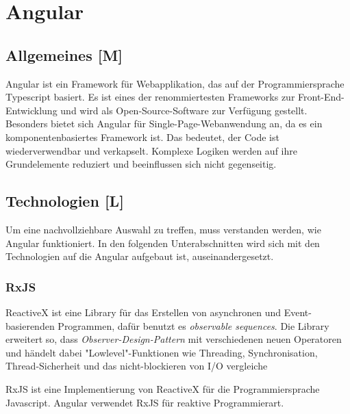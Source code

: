 \section{Angular}

\subsection{Allgemeines [M]}
Angular ist ein Framework für Webapplikation, das auf der Programmiersprache Typescript basiert. Es ist eines der renommiertesten Frameworks zur Front-End-Entwicklung und wird als Open-Source-Software zur Verfügung gestellt. Besonders bietet sich Angular für Single-Page-Webanwendung an, da es ein komponentenbasiertes Framework ist. Das bedeutet, der Code ist wiederverwendbar und verkapselt. Komplexe Logiken werden auf ihre Grundelemente reduziert und beeinflussen sich nicht gegenseitig. 

\subsection{Technologien [L]}
Um eine nachvollziehbare Auswahl zu treffen, muss verstanden werden, wie Angular
funktioniert. In den folgenden Unterabschnitten wird sich mit den Technologien auf die Angular aufgebaut ist, auseinandergesetzt. 

\subsubsection{RxJS}
ReactiveX ist eine Library für das Erstellen von asynchronen und Event-basierenden Programmen, dafür benutzt es  \emph{observable sequences}.
Die Library erweitert so, dass \emph{Observer-Design-Pattern} mit verschiedenen neuen Operatoren und händelt dabei "Lowlevel"-Funktionen wie Threading, Synchronisation, Thread-Sicherheit und das nicht-blockieren von I/O vergleiche \cite{ReactiveXIntro}

RxJS ist eine Implementierung von ReactiveX für die Programmiersprache Javascript. Angular verwendet RxJS für reaktive Programmierart.

